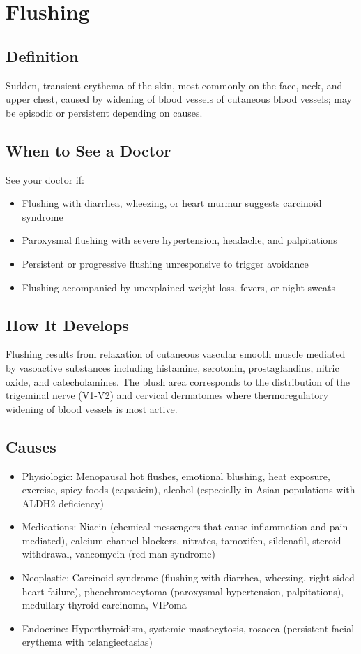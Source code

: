 \chapter{Flushing}

\section*{Definition}
Sudden, transient erythema of the skin, most commonly on the face, neck, and upper chest, caused by widening of blood vessels of cutaneous blood vessels; may be episodic or persistent depending on causes.

\section*{When to See a Doctor}
See your doctor if:
\begin{itemize}
  \item Flushing with diarrhea, wheezing, or heart murmur suggests carcinoid syndrome
  \item Paroxysmal flushing with severe hypertension, headache, and palpitations
  \item Persistent or progressive flushing unresponsive to trigger avoidance
  \item Flushing accompanied by unexplained weight loss, fevers, or night sweats
\end{itemize}

\section*{How It Develops}
Flushing results from relaxation of cutaneous vascular smooth muscle mediated by vasoactive substances including histamine, serotonin, prostaglandins, nitric oxide, and catecholamines. The blush area corresponds to the distribution of the trigeminal nerve (V1-V2) and cervical dermatomes where thermoregulatory widening of blood vessels is most active.

\section*{Causes}
\begin{itemize}
  \item Physiologic: Menopausal hot flushes, emotional blushing, heat exposure, exercise, spicy foods (capsaicin), alcohol (especially in Asian populations with ALDH2 deficiency)
  \item Medications: Niacin (chemical messengers that cause inflammation and pain-mediated), calcium channel blockers, nitrates, tamoxifen, sildenafil, steroid withdrawal, vancomycin (red man syndrome)
  \item Neoplastic: Carcinoid syndrome (flushing with diarrhea, wheezing, right-sided heart failure), pheochromocytoma (paroxysmal hypertension, palpitations), medullary thyroid carcinoma, VIPoma
  \item Endocrine: Hyperthyroidism, systemic mastocytosis, rosacea (persistent facial erythema with telangiectasias)
\end{itemize}

